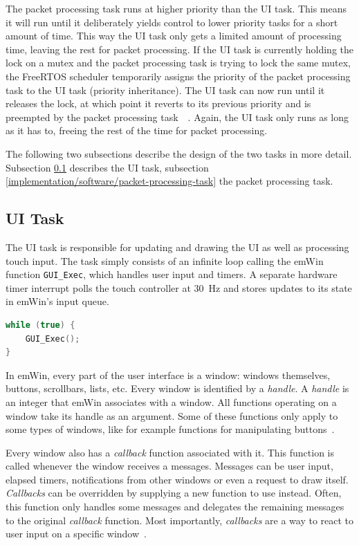 The packet processing task runs at higher priority than the UI task. This means it will run until
it deliberately yields control to lower priority tasks for a short amount of time. This way the UI
task only gets a limited amount of processing time, leaving the rest for packet processing. If the
UI task is currently holding the lock on a mutex and the packet processing task is trying to lock the
same mutex, the FreeRTOS scheduler temporarily assigns the priority of the packet processing task
to the UI task (priority inheritance). The UI task can now run until it releases the lock, at which
point it reverts to its previous priority and is preempted by the packet processing task~\
\cite{freertos-create-mutex-docs}. Again, the UI task only runs as long as it has to, freeing the
rest of the time for packet processing.

The following two subsections describe the design of the two tasks in more detail. Subsection
\ref{implementation/software/ui-task} describes the UI task, subsection
\ref{implementation/software/packet-processing-task} the packet processing task.

\subsection{UI Task}
\label{implementation/software/ui-task}

The UI task is responsible for updating and drawing the UI as well as processing touch input. The
task simply consists of an infinite loop calling the emWin function \mbox{\lstinline{GUI_Exec},}
which handles user input and timers. A separate hardware timer interrupt polls the touch controller
at \SI{30}{\hertz} and stores updates to its state in emWin's input queue.

\begin{lstlisting}[language=C++, caption={Main loop of the UI task}]
while (true) {
    GUI_Exec();
}
\end{lstlisting}

In emWin, every part of the user interface is a window: windows themselves, buttons, scrollbars,
lists, etc. Every window is identified by a \textit{handle}. A \textit{handle} is an integer that
emWin associates with a window. All functions operating on a window take its handle as an argument.
Some of these functions only apply to some types of windows, like for example functions for
manipulating buttons~\cite{emwin-manual}.

Every window also has a \textit{callback} function associated with it. This function is called whenever
the window receives a messages. Messages can be user input, elapsed timers, notifications from other
windows or even a request to draw itself. \textit{Callbacks} can be overridden by supplying a new
function to use instead. Often, this function only handles some messages and delegates the remaining
messages to the original \textit{callback} function. Most importantly, \textit{callbacks} are a way
to react to user input on a specific window~\cite{emwin-manual}.

